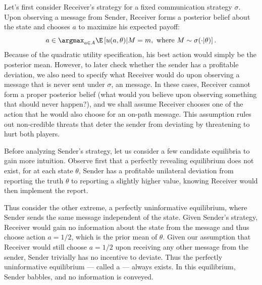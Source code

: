 Let's first consider Receiver's strategy for a fixed communication strategy \(\sigma\).
Upon observing a message from Sender, Receiver forms a posterior belief about the state and chooses \(a\) to maximize his expected payoff:
\[
  a \in \argmax_{a \in A} \E\left[u(a, \theta) | M = m, \text{ where } M \sim \sigma(\cdot|\theta) \right].
\]
Because of the quadratic utility specification, his best action would simply be the posterior mean.
However, to later check whether the sender has a profitable deviation, we also need to specify what Receiver would do upon observing a message that is never sent under \(\sigma\), an  message.
In these cases, Receiver cannot form a proper posterior belief (what would you believe upon observing something that should never happen?), and we shall assume Receiver chooses one of the action that he would also choose for an on-path message.
This assumption rules out non-credible threats that deter the sender from deviating by threatening to hurt both players.

Before analyzing Sender's strategy, let us consider a few candidate equilibria to gain more intuition.
Observe first that a perfectly revealing equilibrium does not exist, for at each state \(\theta\), Sender has a profitable unilateral deviation from reporting the truth \(\theta\) to reporting a slightly higher value, knowing Receiver would then implement the report.

Thus consider the other extreme, a perfectly uninformative equilibrium, where Sender sends the same message independent of the state.
Given Sender's strategy, Receiver would gain no information about the state from the message and thus choose action \(a = 1 / 2\), which is the prior mean of \(\theta\).
Given our assumption that Receiver would still choose \(a = 1 / 2\) upon receiving any other message from the sender, Sender trivially has no incentive to deviate.
Thus the perfectly uninformative equilibrium --- called a  --- always exists.
In this equilibrium, Sender babbles, and no information is conveyed.

